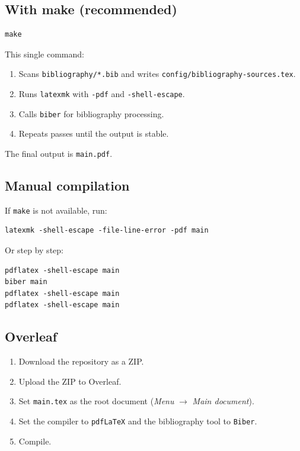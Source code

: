 \subsection{With make (recommended)} \label{sec:make}

\begin{verbatim}
make
\end{verbatim}

This single command:
\begin{enumerate}
  \item Scans \texttt{bibliography/*.bib} and writes
        \texttt{config/bibliography-sources.tex}.
  \item Runs \texttt{latexmk} with \texttt{-pdf} and \texttt{-shell-escape}.
  \item Calls \texttt{biber} for bibliography processing.
  \item Repeats passes until the output is stable.
\end{enumerate}

The final output is \texttt{main.pdf}.

\subsection{Manual compilation} \label{sec:manual}

If \texttt{make} is not available, run:

\begin{verbatim}
latexmk -shell-escape -file-line-error -pdf main
\end{verbatim}

Or step by step:

\begin{verbatim}
pdflatex -shell-escape main
biber main
pdflatex -shell-escape main
pdflatex -shell-escape main
\end{verbatim}

\subsection{Overleaf} \label{sec:overleaf}

\begin{enumerate}
  \item Download the repository as a ZIP.
  \item Upload the ZIP to Overleaf.
  \item Set \texttt{main.tex} as the root document
        (\emph{Menu} $\rightarrow$ \emph{Main document}).
  \item Set the compiler to \texttt{pdfLaTeX} and the bibliography tool to
        \texttt{Biber}.
  \item Compile.
\end{enumerate}

